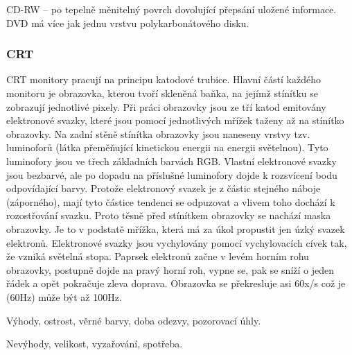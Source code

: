 CD-RW -- po tepelně měnitelný povrch dovolující přepsání uložené informace. DVD má více jak jednu vrstvu polykarbonátového disku.

\subsubsection{CRT}
CRT monitory pracují na principu katodové trubice. Hlavní částí každého monitoru je obrazovka, kterou tvoří skleněná baňka, na jejímž stínítku se zobrazují jednotlivé pixely. Při práci obrazovky jsou ze tří katod emitovány elektronové svazky, které jsou pomocí jednotlivých mřížek taženy až na stínítko obrazovky. Na zadní stěně stínítka obrazovky jsou naneseny vrstvy tzv. luminoforů (látka přeměňující kinetickou energii na energii světelnou). Tyto luminofory jsou ve třech základních barvách RGB. Vlastní elektronové svazky jsou bezbarvé, ale po dopadu na příslušné luminofory dojde k rozsvícení bodu odpovídající barvy. Protože elektronový svazek je z částic stejného náboje (záporného), mají tyto částice tendenci se odpuzovat a vlivem toho dochází k rozostřování svazku. Proto těsně před stínítkem obrazovky se nachází maska obrazovky. Je to v podstatě mřížka, která má za úkol propustit jen úzký svazek elektronů. Elektronové svazky jsou vychylovány pomocí vychylovacích cívek tak, že vzniká světelná stopa. Paprsek elektronů začne v levém horním rohu obrazovky, postupně dojde na pravý horní roh, vypne se, pak se sníží o jeden řádek a opět pokračuje zleva doprava. Obrazovka se překresluje asi 60x/s což je (60Hz) může být až 100Hz.


Výhody, ostrost, věrné barvy, doba odezvy, pozorovací úhly.

Nevýhody, velikost, vyzařování, spotřeba.

\newpage
